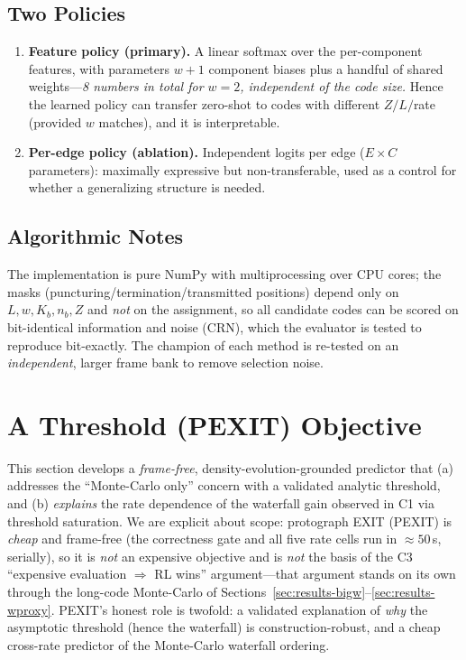 \documentclass[journal]{IEEEtran}
\begin{document}
\subsection{Two Policies}\label{sec:policies}
\begin{enumerate}
\item \textbf{Feature policy (primary).} A linear softmax over the per-component
features, with parameters $w{+}1$ component biases plus a handful of shared
weights---\emph{8 numbers in total for $w{=}2$, independent of the code size.}
Hence the learned policy can transfer zero-shot to codes with different
$Z/L/$rate (provided $w$ matches), and it is interpretable.
\item \textbf{Per-edge policy (ablation).} Independent logits per edge
($E\times C$ parameters): maximally expressive but non-transferable, used as a
control for whether a generalizing structure is needed.
\end{enumerate}

\subsection{Algorithmic Notes}
The implementation is pure NumPy with multiprocessing over CPU cores; the masks
(puncturing/termination/transmitted positions) depend only on $L,w,K_b,n_b,Z$
and \emph{not} on the assignment, so all candidate codes can be scored on
bit-identical information and noise (CRN), which the evaluator is tested to
reproduce bit-exactly. The champion of each method is re-tested on an
\emph{independent}, larger frame bank to remove selection noise.

\section{A Threshold (PEXIT) Objective}\label{sec:pexit}
This section develops a \emph{frame-free}, density-evolution-grounded
predictor that (a) addresses the ``Monte-Carlo only'' concern with a
validated analytic threshold, and (b) \emph{explains} the rate dependence of
the waterfall gain observed in C1 via threshold saturation. We are explicit
about scope: protograph EXIT (PEXIT) is \emph{cheap} and frame-free (the
correctness gate and all five rate cells run in $\approx\!50$\,s, serially),
so it is \emph{not} an expensive objective and is \emph{not} the basis of the
C3 ``expensive evaluation $\Rightarrow$ RL wins'' argument---that argument
stands on its own through the long-code Monte-Carlo of
Sections~\ref{sec:results-bigw}--\ref{sec:results-wproxy}. PEXIT's honest role
is twofold: a validated explanation of \emph{why} the asymptotic threshold
(hence the waterfall) is construction-robust, and a cheap cross-rate predictor
of the Monte-Carlo waterfall ordering.
\end{document}
